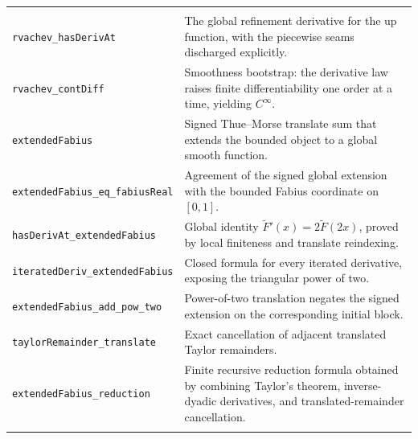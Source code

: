 \documentclass[11pt,a4paper,openany]{book}
\newcommand{\pathbreak}[1]{\nolinkurl{#1}}
\begin{document}
\begin{longtable}{@{}>{\raggedright\arraybackslash}p{}p{}@{}}
\multicolumn{2}{@{}l}{\sffamily\bfseries\color{OliveDark} Differential and global identities} \\
\addlinespace[.45em]
\pathbreak{rvachev_hasDerivAt} & The global refinement derivative for the up function, with the piecewise seams discharged explicitly. \\
\addlinespace[.28em]
\pathbreak{rvachev_contDiff} & Smoothness bootstrap: the derivative law raises finite differentiability one order at a time, yielding $C^\infty$. \\
\addlinespace[.28em]
\pathbreak{extendedFabius} & Signed Thue--Morse translate sum that extends the bounded object to a global smooth function. \\
\addlinespace[.28em]
\pathbreak{extendedFabius_eq_fabiusReal} & Agreement of the signed global extension with the bounded Fabius coordinate on $[0,1]$. \\
\addlinespace[.28em]
\pathbreak{hasDerivAt_extendedFabius} & Global identity $\widetilde F'(x)=2\widetilde F(2x)$, proved by local finiteness and translate reindexing. \\
\addlinespace[.28em]
\pathbreak{iteratedDeriv_extendedFabius} & Closed formula for every iterated derivative, exposing the triangular power of two. \\
\addlinespace[.28em]
\pathbreak{extendedFabius_add_pow_two} & Power-of-two translation negates the signed extension on the corresponding initial block. \\
\addlinespace[.28em]
\pathbreak{taylorRemainder_translate} & Exact cancellation of adjacent translated Taylor remainders. \\
\addlinespace[.28em]
\pathbreak{extendedFabius_reduction} & Finite recursive reduction formula obtained by combining Taylor's theorem, inverse-dyadic derivatives, and translated-remainder cancellation. \\
\addlinespace[.28em]


\end{longtable}
\end{document}
